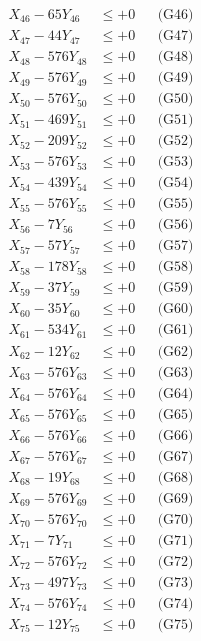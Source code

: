 \documentclass[a4paper,10pt]{article}
\begin{document}
{\begin{align}
X_{46} - 65Y_{46} &\leq +0 && \text{(G46)} \\
X_{47} - 44Y_{47} &\leq +0 && \text{(G47)} \\
X_{48} - 576Y_{48} &\leq +0 && \text{(G48)} \\
X_{49} - 576Y_{49} &\leq +0 && \text{(G49)} \\
X_{50} - 576Y_{50} &\leq +0 && \text{(G50)} \\
\allowbreak
X_{51} - 469Y_{51} &\leq +0 && \text{(G51)} \\
X_{52} - 209Y_{52} &\leq +0 && \text{(G52)} \\
X_{53} - 576Y_{53} &\leq +0 && \text{(G53)} \\
X_{54} - 439Y_{54} &\leq +0 && \text{(G54)} \\
X_{55} - 576Y_{55} &\leq +0 && \text{(G55)} \\
X_{56} - 7Y_{56} &\leq +0 && \text{(G56)} \\
X_{57} - 57Y_{57} &\leq +0 && \text{(G57)} \\
X_{58} - 178Y_{58} &\leq +0 && \text{(G58)} \\
X_{59} - 37Y_{59} &\leq +0 && \text{(G59)} \\
X_{60} - 35Y_{60} &\leq +0 && \text{(G60)} \\
\allowbreak
X_{61} - 534Y_{61} &\leq +0 && \text{(G61)} \\
X_{62} - 12Y_{62} &\leq +0 && \text{(G62)} \\
X_{63} - 576Y_{63} &\leq +0 && \text{(G63)} \\
X_{64} - 576Y_{64} &\leq +0 && \text{(G64)} \\
X_{65} - 576Y_{65} &\leq +0 && \text{(G65)} \\
X_{66} - 576Y_{66} &\leq +0 && \text{(G66)} \\
X_{67} - 576Y_{67} &\leq +0 && \text{(G67)} \\
X_{68} - 19Y_{68} &\leq +0 && \text{(G68)} \\
X_{69} - 576Y_{69} &\leq +0 && \text{(G69)} \\
X_{70} - 576Y_{70} &\leq +0 && \text{(G70)} \\
\allowbreak
X_{71} - 7Y_{71} &\leq +0 && \text{(G71)} \\
X_{72} - 576Y_{72} &\leq +0 && \text{(G72)} \\
X_{73} - 497Y_{73} &\leq +0 && \text{(G73)} \\
X_{74} - 576Y_{74} &\leq +0 && \text{(G74)} \\
X_{75} - 12Y_{75} &\leq +0 && \text{(G75)} \\

\end{align}}
\end{document}
